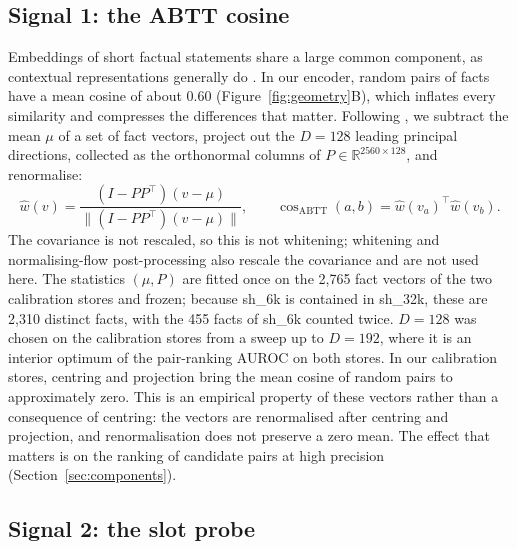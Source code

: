 \documentclass{CUP-JNL-NLP}
\newcommand{\sub}[1]{\textsf{sh\_#1}}                    %
\begin{document}
\subsection{Signal 1: the ABTT cosine}
\label{sec:abtt}

Embeddings of short factual statements share a large common component, as contextual representations generally do \citep{ethayarajh2019contextual,bis2021much,godey2024anisotropy}. In our encoder, random pairs of facts have a mean cosine of about 0.60 (Figure~\ref{fig:geometry}B), which inflates every similarity and compresses the differences that matter. Following \citet{mu2018allbutthetop}, we subtract the mean $\mu$ of a set of fact vectors, project out the $D=128$ leading principal directions, collected as the orthonormal columns of $P\in\mathbb{R}^{2560\times128}$, and renormalise:
\begin{equation}
\hat w(v)=\frac{(I-PP^{\top})(v-\mu)}{\lVert (I-PP^{\top})(v-\mu)\rVert},\qquad
\cos_{\mathrm{ABTT}}(a,b)=\hat w(v_a)^{\top}\hat w(v_b).
\end{equation}
The covariance is not rescaled, so this is not whitening; whitening \citep{su2021whitening,huang2021whiteningbert} and normalising-flow post-processing \citep{li2020sentence} also rescale the covariance and are not used here. The statistics $(\mu,P)$ are fitted once on the 2,765 fact vectors of the two calibration stores and frozen; because \sub{6k} is contained in \sub{32k}, these are 2,310 distinct facts, with the 455 facts of \sub{6k} counted twice. $D=128$ was chosen on the calibration stores from a sweep up to $D=192$, where it is an interior optimum of the pair-ranking AUROC on both stores. In our calibration stores, centring and projection bring the mean cosine of random pairs to approximately zero. This is an empirical property of these vectors rather than a consequence of centring: the vectors are renormalised after centring and projection, and renormalisation does not preserve a zero mean. The effect that matters is on the ranking of candidate pairs at high precision (Section~\ref{sec:components}).

\subsection{Signal 2: the slot probe}
\label{sec:probe}
\end{document}

